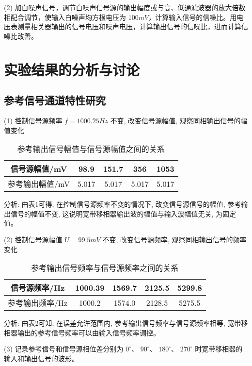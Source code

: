 \documentclass{whureport}
\begin{document}
\begin{multicols}{2}
(2) 加白噪声信号，调节白噪声信号源的输出幅度或与高、低通滤波器的放大倍数相配合调节，使输入白噪声均方根电压为 $100mV$，计算输入信号的信噪比。用电压表测量相关器输出的信号电压和噪声电压，计算输出信号的信噪比，进而计算信噪比改善。


\section{实验结果的分析与讨论}

\subsection{参考信号通道特性研究}

(1) 控制信号源频率 $f = 1000.25Hz$ 不变, 改变信号源幅值, 观察同相输出信号的幅值变化

\begin{table}[H]
	\centering
	\caption{参考输出信号幅值与信号源幅值之间的关系}
	\begin{tabular}{ |c|c|c|c|c| } 
	 \hline
	 信号源幅值/mV & 98.9 & 151.7 & 356 & 1053 \\ 
	 \hline
	 参考输出幅值/mV & 5.017 & 5.017 & 5.017 & 5.017 \\ 
	 \hline
	\end{tabular}
\end{table}

分析: 由表1可得, 在控制信号源频率不变的情况下, 改变信号源信号的幅值, 参考输出信号的幅值不变, 这说明宽带移相器输出波的幅值与输入波幅值无关, 为固定值。

(2) 控制信号源幅值 $U = 99.5mV$ 不变, 改变信号源频率, 观察同相输出信号的频率变化

\begin{table}[H]
\centering
\caption{参考输出信号频率与信号源频率之间的关系}
\begin{tabular}{ |c|c|c|c|c| } 
 \hline
 信号源频率/Hz & 1000.39 & 1569.7 & 2125.5 & 5299.8 \\ 
 \hline
 参考输出频率/Hz & 1000.2 & 1574.0 & 2128.5 & 5275.5 \\ 
 \hline
\end{tabular}
\end{table}

分析: 由表2可知, 在误差允许范围内, 参考输出信号频率与信号源频率相等, 宽带移相器输出的参考信号频率可以由输入信号频率调控。

(3) 记录参考信号和信号源相位差分别为 $0^\circ$、 $90^\circ$、 $180^\circ$、 $270^\circ$ 时宽带移相器的输入和输出信号的波形。


\end{multicols}
\end{document}
